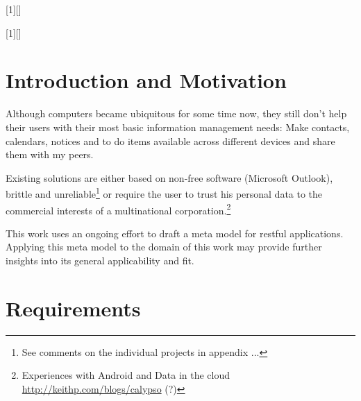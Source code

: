 \documentclass[12pt,a4paper]{scrartcl}		%
\newcommand{\citeurl}[2]{\url{#1} (#2)}
\begin{document}
[1][]
  {\lstset{language=Java,float=tb,#1}}%
  {} %

[1][]
  {\lstset{float=tb,#1}}%
  {} %

\lstset{ %
  language=Java,
  float=tb,
  frame=single,
  captionpos=b
}

\title{}
\subtitle{}
\author{Thomas Koch\\\url{thomas@koch.ro}\\matriculation number 7250371}
\publishers{Fernuniversität Hagen\\Faculty of mathematics and computer science}
\date{\today}
\maketitle{}

\tableofcontents{}
\begin{abstract}

\end{abstract}
\newpage{}


\section{Introduction and Motivation}

Although computers became ubiquitous for some time now, they still don't help
their users with their most basic information management needs: Make contacts,
calendars, notices and to do items available across different devices and share
them with my peers.

Existing solutions are either based on non-free software (Microsoft Outlook),
brittle and unreliable\footnote{See comments on the individual projects in
  appendix ...} or require the user to trust his personal data to the commercial
interests of a multinational corporation.\footnote{Experiences with Android and Data in the cloud \citeurl{http://keithp.com/blogs/calypso}{?}}

This work uses an ongoing effort to draft a meta model for restful
applications. Applying this meta model to the domain of this work may provide
further insights into its general applicability and fit.

\section{Requirements}
\end{document}
